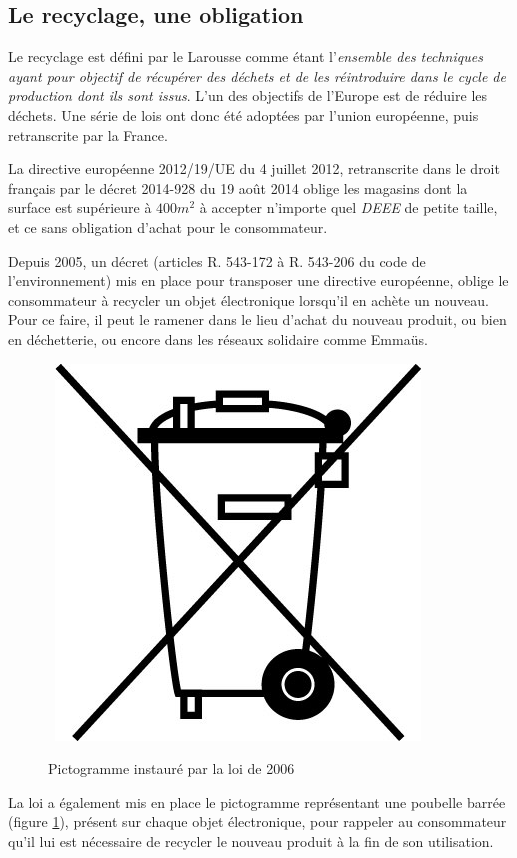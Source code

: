 \subsection{Le recyclage, une obligation}

Le recyclage est défini par le Larousse  comme étant l'\og{}\textit{ensemble des techniques ayant pour objectif de récupérer des déchets et de les réintroduire dans le cycle de production dont ils sont issus}\fg{}. L'un des objectifs de l'Europe est de réduire les déchets. Une série de lois ont donc été adoptées par l'union européenne, puis retranscrite par la France. 

La directive européenne 2012/19/UE du 4 juillet 2012, retranscrite dans le droit français par le décret 2014-928 du 19 août 2014 oblige  les magasins dont la surface est supérieure à $400m^2$ à accepter n'importe quel \textit{DEEE} de petite taille, et ce sans obligation d'achat pour le consommateur. 

Depuis 2005, un décret (articles R. 543-172 à R. 543-206 du code de l'environnement) mis en place pour transposer%
 une directive européenne, oblige le consommateur à recycler un objet électronique lorsqu'il en achète un nouveau. Pour ce faire, il peut le ramener dans le lieu d'achat du nouveau produit, ou bien en déchetterie, ou encore dans les réseaux solidaire comme Emmaüs.

\begin{figure}
~\includegraphics[scale=0.33]{Rsc/pictopoubellebarree.jpg} 
\caption{Pictogramme instauré par la loi de 2006}
\label{fig::picPoubelleBarree}
\end{figure} 
La loi a également mis en place le pictogramme représentant une poubelle barrée (figure \ref{fig::picPoubelleBarree}), présent sur chaque objet électronique, pour rappeler au consommateur qu'il lui est nécessaire de recycler le nouveau produit à la fin de son utilisation.

